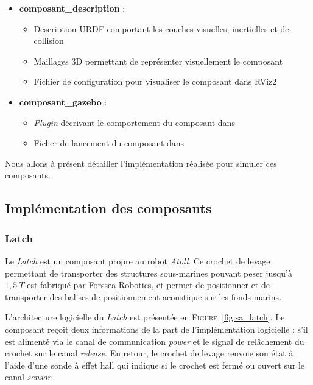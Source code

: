 			\begin{itemize}
				\renewcommand{\labelitemi}{\textbullet}
				\item \textbf{composant\_description} :
				\begin{itemize}[noitemsep]
					\item Description URDF comportant les couches visuelles, inertielles et de collision
					\item Maillages 3D permettant de représenter visuellement le composant
					\item Fichier de configuration pour visualiser le composant dans RViz2
				\end{itemize}
				\item \textbf{composant\_gazebo} :
				\begin{itemize}[noitemsep]
					\item \textit{Plugin} décrivant le comportement du composant dans \gazebo{}
					\item Ficher de lancement du composant dans \gazebo{}
				\end{itemize}
			\end{itemize}

		Nous allons à présent détailler l'implémentation réalisée pour simuler ces composants.

		\subsection{Implémentation des composants}

			\subsubsection{Latch}

				Le \textit{Latch} est un composant propre au robot \textit{Atoll}. Ce crochet de levage permettant de transporter des structures sous-marines pouvant peser jusqu'à $1,5\ T$ est fabriqué par Forssea Robotics, et permet de positionner et de transporter des balises de positionnement acoustique sur les fonds marins.

				L'architecture logicielle du \textit{Latch} est présentée en \textsc{Figure}~\ref{fig:sa_latch}. Le composant reçoit deux informations de la part de l'implémentation logicielle : s'il est alimenté via le canal de communication \textit{power} et le signal de relâchement du crochet sur le canal \textit{release}. En retour, le crochet de levage renvoie son état à l'aide d'une sonde à effet hall qui indique si le crochet est fermé ou ouvert sur le canal \textit{sensor}.

